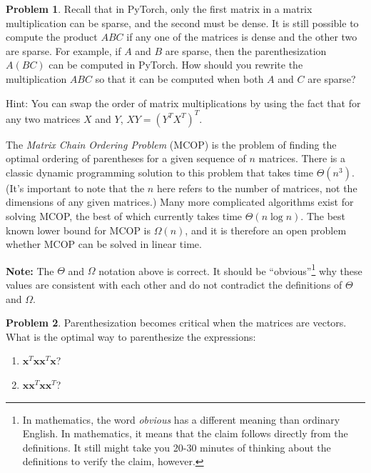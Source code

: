 \documentclass[10pt]{article}
\theoremstyle{definition}
\newtheorem{problem}{Problem}
\newcommand{\trans}[1]{{#1}^{T}}
\newcommand{\x}{\mathbf x}
\begin{document}
\newpage
\begin{problem}
Recall that in PyTorch, only the first matrix in a matrix multiplication can be sparse,
and the second must be dense.
It is still possible to compute the product $ABC$ if any one of the matrices is dense and the other two are sparse.
For example, if $A$ and $B$ are sparse, then the parenthesization $A(BC)$ can be computed in PyTorch.
How should you rewrite the multiplication $ABC$ so that it can be computed when both $A$ and $C$ are sparse?

    \vspace{0.1in}
\noindent
Hint: You can swap the order of matrix multiplications by using the fact that for any two matrices $X$ and $Y$, $XY = \trans{(\trans Y \trans X)}$.
\end{problem}

\newpage
The \emph{Matrix Chain Ordering Problem} (MCOP) is the problem of finding the optimal ordering of parentheses for a given sequence of $n$ matrices.
There is a classic dynamic programming solution to this problem that takes time $\Theta(n^3)$.
(It's important to note that the $n$ here refers to the number of matrices, not the dimensions of any given matrices.)
Many more complicated algorithms exist for solving MCOP,
the best of which currently takes time $\Theta(n \log n)$.
The best known lower bound for MCOP is $\Omega(n)$,
and it is therefore an open problem whether MCOP can be solved in linear time.

\textbf{Note:}
The $\Theta$ and $\Omega$ notation above is correct.
It should be ``obvious''\footnote{In mathematics, the word \emph{obvious} has a different meaning than ordinary English.  In mathematics, it means that the claim follows directly from the definitions.  It still might take you 20-30 minutes of thinking about the definitions to verify the claim, however.} why these values are consistent with each other and do not contradict the definitions of $\Theta$ and $\Omega$.


\begin{problem}
    \label{prob:8}
    Parenthesization becomes critical when the matrices are vectors.
    What is the optimal way to parenthesize the expressions:
    \begin{enumerate}
        \item
            $\trans \x \x \trans \x \x$?
            \vspace{3in}
        \item
            $\x \trans \x \x \trans \x$?
            \vspace{3in}
    \end{enumerate}
\end{problem}
\end{document}
